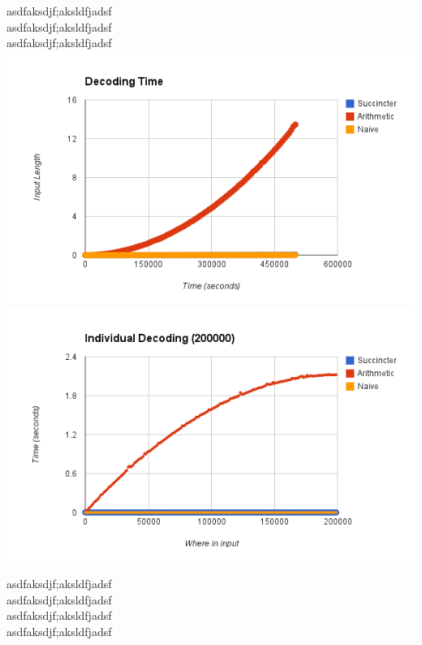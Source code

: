 \documentclass{article}
\begin{document}
asdfaksdjf;aksldfjadsf\\
asdfaksdjf;aksldfjadsf\\
asdfaksdjf;aksldfjadsf\\


\includegraphics[scale=0.4]{images/decoding_time}
\includegraphics[scale=0.4]{images/individual_decode_20000}
\afterpage{\vfill}

asdfaksdjf;aksldfjadsf\\
asdfaksdjf;aksldfjadsf\\
asdfaksdjf;aksldfjadsf\\
asdfaksdjf;aksldfjadsf\\
\end{document}
